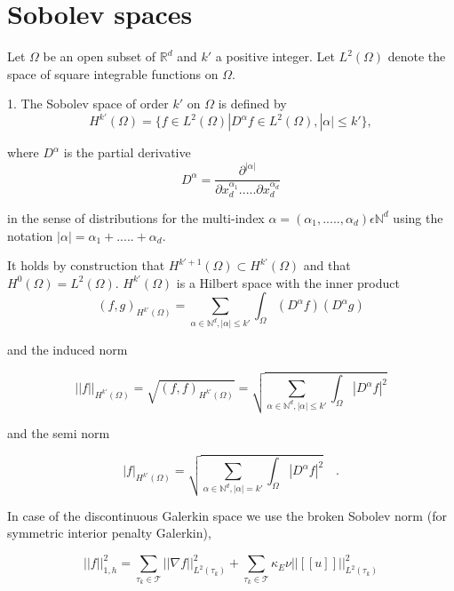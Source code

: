 \documentclass[a4paper]{book}
\begin{document}
\section{Sobolev spaces} 

Let $\Omega$ be an open subset of $\mathbb{R}^d$ and $k'$ a positive integer. Let $L^2(\Omega)$ denote the space of square integrable functions on $\Omega$. 

1. The Sobolev space of order $k'$ on $\Omega$ is defined by\\
\begin{equation}
H^{k'} (\Omega) = \lbrace f \in L^2 (\Omega) | D^\alpha f \in L^2 (\Omega), |\alpha| \leq k' \rbrace ,
\end{equation} 

where $D^\alpha$ is the partial derivative
\begin{equation}
D^\alpha = \frac{\partial^{|\alpha|}}{\partial x_d^{\alpha_1} ..... \partial x_d^{\alpha_d}}
\end{equation}

in the sense of distributions for the multi-index $\alpha = (\alpha_1,.....,\alpha_d) \epsilon \mathbb{N}^d$ using the notation $|\alpha| = \alpha_1 + ..... + \alpha_d $.

It holds by construction that $H^{k'+1}(\Omega) \subset H^{k'} (\Omega)$ and that $H^0 (\Omega) = L^2 (\Omega)$. $H^{k'}(\Omega)$ is a Hilbert space with the inner product
\begin{equation}
(f,g)_{H^{k'}(\Omega)} = \sum_{\alpha \in \mathbb{N}^d, |\alpha| \leq k'} \int_\Omega (D^\alpha f) (D^\alpha g)
\end{equation}

and the induced norm 

\begin{equation}
||f||_{H^{k'} (\Omega)} = \sqrt{(f,f)_{H^{k'}(\Omega)}} = \sqrt{\sum_{\alpha \in \mathbb{N}^d, |\alpha| \leq k'} \int_\Omega |D^\alpha f|^2}
\end{equation}

and the semi norm 

\begin{equation}
|f|_{H^{k'} (\Omega)} = \sqrt{\sum_{\alpha \in \mathbb{N}^d, |\alpha| = k'} \int_\Omega |D^\alpha f|^2} \quad \textrm{.}
\end{equation}

In case of the discontinuous Galerkin space we use the broken Sobolev norm (for symmetric interior penalty Galerkin), \cite{Montlaur2}

\begin{equation}
||f||_{1,h}^2 = \sum_{\tau_k \in \mathcal{T}} ||\nabla f||_{L^2(\tau_k)}^2 + \sum_{\tau_k \in \mathcal{T}} \kappa_E \nu ||[[u]]||_{L^2 (\tau_k)}^2
\end{equation}
\end{document}
